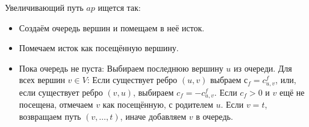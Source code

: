 Увеличивающий путь $ ap $ ищется так:

\begin{itemize}
    \item Создаём очередь вершин и помещаем в неё исток.
    \item Помечаем исток как посещённую вершину.
    \item Пока очередь не пуста:
    \subitem Выбираем последнюю вершину $ u $ из очереди.
    \subitem Для всех вершин $ v \in V $:
    \subsubitem Если существует ребро $ (u, v) $
                выбраем $ с_f = c^{f}_{u, v} $, или,
                если существует ребро $ (v, u) $,
                выбираем $ c_f = -c^{f}_{u, v} $.
    \subsubitem Если $ c_f > 0 $ и $ v $ ещё не посещена,
                отмечаем $ v $ как посещённую, с родителем $ u $.
    \subsubitem Если $ v = t $, возвращаем путь $ (v, \dots, t) $,
                иначе добавляем $ v $ в очередь.
\end{itemize}
